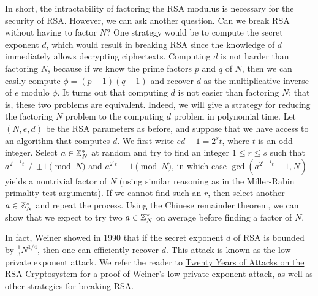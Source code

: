 In short, the intractability of factoring the RSA modulus is necessary for the 
security of RSA. However, we can ask another question. Can we break RSA 
without having to factor $N$? One strategy would be to compute the secret 
exponent $d$, which would result in breaking RSA since the knowledge of $d$ 
immediately allows decrypting ciphertexts. Computing $d$ is not harder than 
factoring $N$, because if we know the prime factors $p$ and $q$ of $N$, 
then we can easily compute $\phi = (p-1)(q-1)$ and recover $d$ as the 
multiplicative inverse of $e$ modulo $\phi$. It turns out that computing 
$d$ is not easier than factoring $N$; that is, these two problems are equivalent. 
Indeed, we will give a strategy for reducing the factoring $N$ problem 
to the computing $d$ problem in polynomial time. Let $(N, e, d)$ be the RSA 
parameters as before, and suppose that we have access to an algorithm that 
computes $d$. We first write $ed - 1 = 2^s t$, where $t$ is an odd integer. 
Select $a \in \mathbb{Z}_N^*$ at random and try to find an integer $1 \leq r \leq s$ 
such that $a^{2^{r-1}t} \not\equiv \pm 1 \pmod N$ and $a^{2^r t} \equiv 1 \pmod N$, 
in which case $\gcd(a^{2^{r-1}t} - 1, N)$ yields a nontrivial factor of $N$ 
(using similar reasoning as in the Miller-Rabin primality test arguments). 
If we cannot find such an $r$, then select another $a \in \mathbb{Z}_N^*$ and repeat the 
process. Using the Chinese remainder theorem, we can show that we expect to 
try two $a \in \mathbb{Z}_N^*$ on average before finding a factor of $N$. 

In fact, Weiner showed in 1990 \cite{54902} that if the secret exponent $d$ 
of RSA is bounded by $\frac13 N^{1/4}$, then one can efficiently recover $d$. 
This attack is known as the low private exponent attack. We refer the reader 
to \href{https://crypto.stanford.edu/~dabo/papers/RSA-survey.pdf}{Twenty 
Years of Attacks on the RSA Cryptosystem} for a proof of Weiner's low private 
exponent attack, as well as other strategies for breaking RSA. 